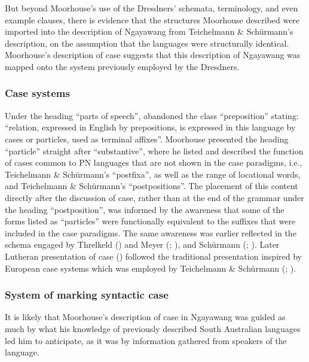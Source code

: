 But beyond Moorhouse’s use of the Dresdners' schemata, terminology, and even example clauses, there is evidence that the structures Moorhouse described were imported into the description of Ngayawang from Teichelmann \& Schürmann’s description, on the assumption that the languages were structurally identical. Moorhouse’s description of case suggests that this description of Ngayawang was mapped onto the system previously employed by the Dresdners.

\subsubsection{Case systems}
\label{sec:key:6.4.1.1}\label{bkm:Ref333854849}

Under the heading “parts of speech”, \citet[2]{moorhouse_vocabulary_1846} abandoned the class “preposition” stating: “relation, expressed in English by prepositions, is expressed in this language by cases or particles, used as terminal affixes”. Moorhouse presented the heading “particle” straight after “substantive'', where he listed and described the function of cases common to PN languages that are not shown in the case paradigms, i.e., Teichelmann \& Schürmann’s “postfixa'', as well as the range of locational words, and Teichelmann \& Schürmann’s “postpositions''. The placement of this content directly after the discussion of case, rather than at the end of the grammar under the heading “postposition'', was informed by the awareness that some of the forms listed as “particles” were functionally equivalent to the suffixes that were included in the case paradigms. The same awareness was earlier reflected in the schema engaged by Threlkeld (\citeyear{threlkeld_australian_1834}) and Meyer (\citeyear{meyer_vocabulary_1843}; ), and Schürmann (\citeyear{schurmann_letter_1844}; ). Later Lutheran presentation of case () followed the traditional presentation inspired by European case systems which was employed by Teichelmann \& Schürmann (\citeyear{teichelmann_outlines_1840}; ).

\subsubsection{System of marking syntactic case}
\label{sec:key:6.4.1.2}\label{bkm:Ref340295413}

It is likely that Moorhouse’s description of case in Ngayawang was guided as much by what his knowledge of previously described South Australian languages led him to anticipate, as it was by information gathered from speakers of the language.

